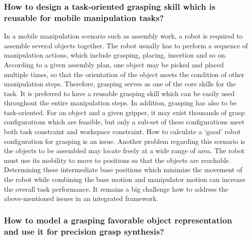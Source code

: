 \subsubsection{How to design a task-oriented grasping skill which is reusable for mobile manipulation tasks?}

In a mobile manipulation scenario such as assembly work, a robot is required to assemble several objects together. The robot usually has to perform a sequence of manipulation actions, which include grasping, placing, insertion and so on. According to a given assembly plan, one object may be picked and placed multiple times, so that the orientation of the object meets the condition of other manipulation steps. Therefore, grasping serves as one of the core skills for the task. It is preferred to have a reusable grasping skill which can be easily used throughout the entire manipulation steps. In addition, grasping has also to be task-oriented. For an object and a given gripper, it may exist thousands of grasp configurations which are feasible, but only a sub-set of these configurations meet both  task constraint and workspace constraint. How to calculate a `good' robot configuration for grasping is an issue.  Another problem regarding this scenario is the objects to be assembled may locate freely at a wide range of area. The robot must use its mobility to move to positions so that the objects are reachable. Determining these intermediate base positions which minimize the movement of the robot while combining the base motion and manipulator motion can increase the overall task performance. It remains a big challenge how to address the above-mentioned issues in an integrated framework. 

\subsubsection{How to model a grasping favorable object representation and use it for precision grasp synthesis?}

